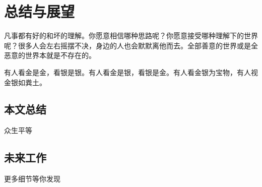 \chapter{总结与展望}

凡事都有好的和坏的理解。你愿意相信哪种思路呢？你愿意接受哪种理解下的世界呢？很多人会左右摇摆不决，身边的人也会默默离他而去。全部善意的世界或是全恶意的世界本就是不存在的。

有人看金是金，看银是银。有人看金是银，看银是金。有人看金银为宝物，有人视金银如粪土。

\section{本文总结}

众生平等

\section{未来工作}

更多细节等你发现